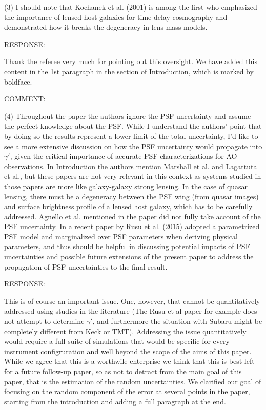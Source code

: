 \documentclass[a4paper,11pt]{article}
\begin{document}
(3) I should note that Kochanek et al. (2001) is among the first 
who emphasized the importance of lensed host galaxies 
for time delay cosmography and demonstrated 
how it breaks the degeneracy in lens mass models.


RESPONSE:

Thank the referee very much for pointing out this oversight. 
We have added this content in the 1st paragraph 
in the section of Introduction, which is marked by boldface.

COMMENT:

(4) Throughout the paper the authors ignore the PSF uncertainty and
assume the perfect knowledge about the PSF. While I understand the
authors' point that by doing so the results represent a lower limit of
the total uncertainty, I'd like to see a more extensive discussion on
how the PSF uncertainty would propagate into $\gamma'$, given the
critical importance of accurate PSF characterizations for AO
observations. In Introduction the authors mention Marshall et al. and
Lagattuta et al., but these papers are not very relevant in this
context as systems studied in those papers are more like galaxy-galaxy
strong lensing. In the case of quasar lensing, there must be a
degeneracy between the PSF wing (from quasar images) and surface
brightness profile of a lensed host galaxy, which has to be carefully
addressed. Agnello et al. mentioned in the paper did not fully take
account of the PSF uncertainty. In a recent paper by Rusu et
al. (2015) adopted a parametrized PSF model and marginalized over PSF
parameters when deriving physical parameters, and thus should be
helpful in discussing potential impacts of PSF uncertainties and
possible future extensions of the present paper to address the
propagation of PSF uncertainties to the final result.

RESPONSE:

This is of course an important issue. One, however, that cannot be
quantitatively addressed using studies in the literature (The Rusu et
al paper for example does not attempt to determine $\gamma'$, and
furthermore the situation with Subaru might be completely different
from Keck or TMT). Addressing the issue quantitatively would require a
full suite of simulations that would be specific for every instrument
configruration and well beyond the scope of the aims of this
paper. While we agree that this is a worthwile enterprise we think
that this is best left for a future follow-up paper, so as not to
detract from the main goal of this paper, that is the estimation of
the random uncertainties. We clarified our goal of focusing on the
random component of the error at several points in the paper, starting
from the introduction and adding a full paragraph at the end.
\end{document}
